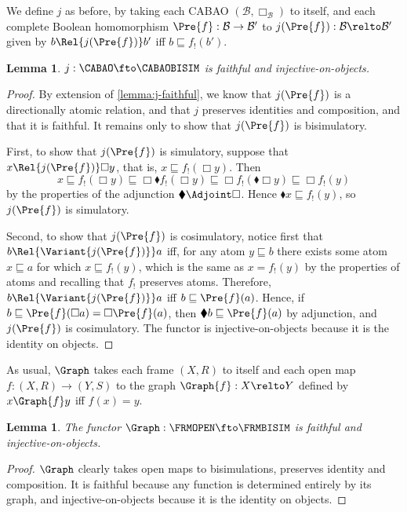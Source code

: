 \documentclass[10pt,a4paper]{article}
\newtheorem{lemma}[theorem]{Lemma}
\begin{document}
We define \(j\) as before, by taking each CABAO
\((\mathcal{B}, \Box_{\mathcal{B}})\) to itself, and each complete
Boolean homomorphism \(\Pre{f} : \mathcal{B} \to \mathcal{B}'\) to
\(j(\Pre{f}) : \mathcal{B} \relto \mathcal{B}'\) given by
\(b \Rel{j(\Pre{f})} b'\) iff \(b \sqsubseteq f_!(b')\).

\begin{lemma}
  \(j : \CABAO \fto \CABAOBISIM\) is faithful and injective-on-objects.
\end{lemma}
\begin{proof}
  By extension of \cref{lemma:j-faithful}, we know that \(j(\Pre{f})\) is a
  directionally atomic relation, and that \(j\) preserves identities and
  composition, and that it is faithful. It remains only to show that
  \(j(\Pre{f})\) is bisimulatory.

  First, to show that \(j(\Pre{f})\) is simulatory, suppose that
  \(x \Rel{j(\Pre{f})} \Box y\), that is, \(x \sqsubseteq f_!(\Box y)\).
  Then
  \[
    x
    \sqsubseteq f_!(\Box y)
    \sqsubseteq \Box \blacklozenge f_!(\Box y)
    \sqsubseteq \Box f_!(\blacklozenge \Box y)
    \sqsubseteq \Box f_!(y)
  \]
  by the properties of the adjunction \(\blacklozenge \Adjoint \Box\). Hence
  \(\blacklozenge x \sqsubseteq f_!(y)\), so \(j(\Pre{f})\) is simulatory.

  Second, to show that \(j(\Pre{f})\) is cosimulatory, notice first that
  \(b \Rel{\Variant{j(\Pre{f})}} a\) iff, for any atom \(y \sqsubseteq b\) there
  exists some atom \(x \sqsubseteq a\) for which \(x \sqsubseteq f_!(y)\), which
  is the same as \(x = f_!(y)\) by the properties of atoms and recalling that
  \(f_!\) preserves atoms. Therefore, \(b \Rel{\Variant{j(\Pre{f})}} a\) iff
  \(b \sqsubseteq \Pre{f}(a)\). Hence, if
  \(b \sqsubseteq \Pre{f}(\Box a) = \Box \Pre{f}(a)\), then
  \(\blacklozenge b \sqsubseteq \Pre{f}(a)\) by adjunction, and \(j(\Pre{f})\) is
  cosimulatory. The functor is injective-on-objects because it is the identity
  on objects.
\end{proof}

As usual, \(\Graph\) takes each frame \((X, R)\) to itself and each open map
\(f : (X, R) \to (Y, S)\) to the graph \(\Graph{f} : X \relto Y\) defined by
\(x \Graph{f} y\) iff \(f(x) = y\).

\begin{lemma}
  The functor \(\Graph : \FRMOPEN \fto \FRMBISIM\) is faithful and
  injective-on-objects.
\end{lemma}
\begin{proof}
  \(\Graph\) clearly takes open maps to bisimulations, preserves identity and
  composition. It is faithful because any function is determined entirely by its
  graph, and injective-on-objects because it is the identity on objects.
\end{proof}
\end{document}
